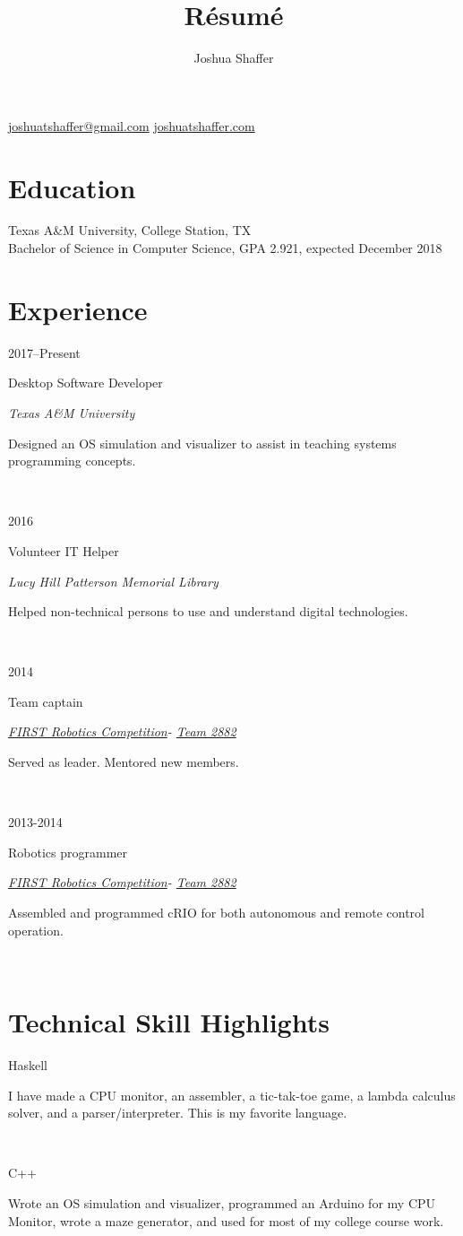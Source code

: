 \documentclass{article}
\title{R\'esum\'e}
\author{Joshua Shaffer}
\newcommand{\entry}[4]{

\begin{minipage}[t]{.15\textwidth}
\hfill #1
\end{minipage}
\hfill\vline\hfill
\begin{minipage}[t]{.80\textwidth}
#2

\textit{#3}

\footnotesize{#4}
\end{minipage}\\\vspace{.1em}}
\newcommand{\jskill}[2]{

\begin{minipage}[t]{.15\textwidth}
\hfill #1
\end{minipage}
\hspace{.05em}\vline\hspace{.05em}
\begin{minipage}[t]{.80\textwidth}
#2
\end{minipage}\\\vspace{.1em}}
\newcommand{\frc}{\href{https://www.firstinspires.org/robotics/frc}{FIRST Robotics Competition}}
\newcommand{\frct}{\href{https://www.thebluealliance.com/team/2882}{Team 2882}}
\begin{document}
\begin{center}
 \begin{minipage}{2in}%
  \begin{center}
   \mbox{\huge\bfseries\theauthor}
   \mbox{\href{mailto:joshuatshaffer@gmail.com}{joshuatshaffer@gmail.com}}
   \mbox{\href{http://joshuatshaffer.com}{joshuatshaffer.com}}
  \end{center}
 \end{minipage}
 \hfill
\end{center}

\section{Education}

\noindent
Texas A\&M University, College Station, TX \\
Bachelor of Science in Computer Science, GPA 2.921, expected December 2018

\section{Experience}

\noindent
\entry
{2017--Present}
{Desktop Software Developer}
{Texas A\&M University}
{Designed an OS simulation and visualizer to assist in teaching systems programming concepts.}

\entry
{2016}
{Volunteer IT Helper}
{Lucy Hill Patterson Memorial Library}
{Helped non-technical persons to use and understand digital technologies.}

\entry
{2014}
{Team captain}
{\frc - \frct}
{Served as leader. Mentored new members.}

\entry
{2013-2014}
{Robotics programmer}
{\frc - \frct}
{Assembled and programmed cRIO for both autonomous and remote control operation.}

\section{Technical Skill Highlights}

\noindent
\jskill{Haskell}{I have made a CPU monitor, an assembler, a tic-tak-toe game, a lambda calculus solver, and a parser/interpreter. This is my favorite language.}

\jskill{C++}{Wrote an OS simulation and visualizer, programmed an Arduino for my CPU Monitor, wrote a maze generator, and used for most of my college course work.}
\end{document}

